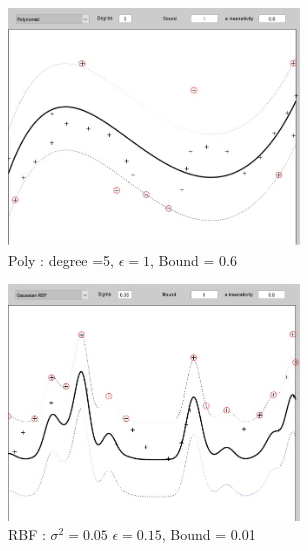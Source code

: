 \begin{figure}[ht]
\begin{subfigure}[b]{0.35\textwidth}
		\includegraphics[width = 0.85\textwidth]{Exercise2/Report/Ex2.1_Poly_deg=5_E=1_B=0.6}
		\caption{Poly : degree =5, $\epsilon = 1$, Bound = 0.6 }\label{fig:Poly_deg=5_E=1_B=0.6}
	\end{subfigure}
	\begin{subfigure}[b]{0.35\textwidth}
		\centering
		\captionsetup{width=0.8\linewidth}
		\includegraphics[width = 0.85\textwidth]{Exercise2/Report/Ex2.1_RBF_sig=0.05_E=1_B=0.6}
		\caption{RBF : $\sigma^2 = 0.05$ $\epsilon = 0.15$, Bound = 0.01 }\label{fig:RBF_sig=0.05_E=1_B=0.6}
	\end{subfigure}%
	\begin{subfigure}[b]{0.35\textwidth}
		\centering
		\captionsetup{width=0.8\linewidth}

\end{subfigure}
\end{figure}
